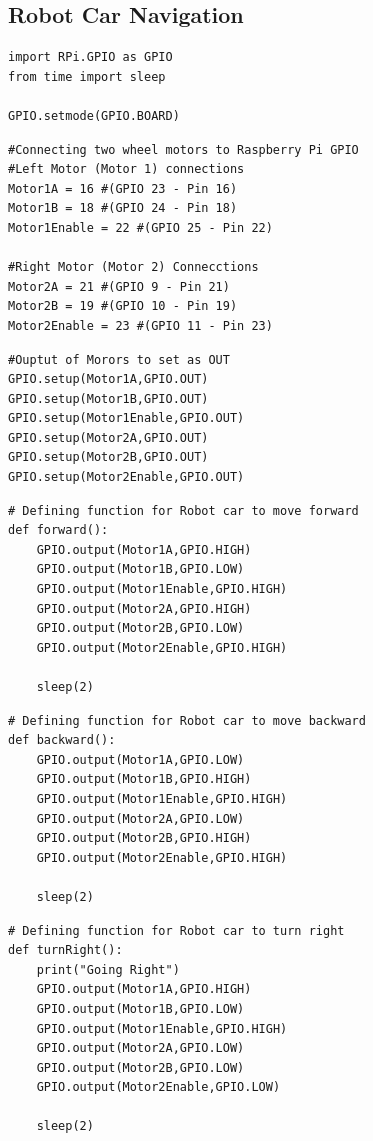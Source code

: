 \subsection{Robot Car Navigation}
\begin{verbatim}
import RPi.GPIO as GPIO
from time import sleep

GPIO.setmode(GPIO.BOARD)
\end{verbatim}

\begin{verbatim}
#Connecting two wheel motors to Raspberry Pi GPIO 
#Left Motor (Motor 1) connections
Motor1A = 16 #(GPIO 23 - Pin 16)
Motor1B = 18 #(GPIO 24 - Pin 18)
Motor1Enable = 22 #(GPIO 25 - Pin 22)

#Right Motor (Motor 2) Connecctions
Motor2A = 21 #(GPIO 9 - Pin 21)
Motor2B = 19 #(GPIO 10 - Pin 19)
Motor2Enable = 23 #(GPIO 11 - Pin 23)
\end{verbatim}

\begin{verbatim}
#Ouptut of Morors to set as OUT
GPIO.setup(Motor1A,GPIO.OUT)
GPIO.setup(Motor1B,GPIO.OUT)
GPIO.setup(Motor1Enable,GPIO.OUT)
GPIO.setup(Motor2A,GPIO.OUT)
GPIO.setup(Motor2B,GPIO.OUT)
GPIO.setup(Motor2Enable,GPIO.OUT)

\end{verbatim}

\begin{verbatim}
# Defining function for Robot car to move forward
def forward():
	GPIO.output(Motor1A,GPIO.HIGH)
	GPIO.output(Motor1B,GPIO.LOW)
	GPIO.output(Motor1Enable,GPIO.HIGH) 
	GPIO.output(Motor2A,GPIO.HIGH)
	GPIO.output(Motor2B,GPIO.LOW)
	GPIO.output(Motor2Enable,GPIO.HIGH) 

	sleep(2)
\end{verbatim}

\begin{verbatim}
# Defining function for Robot car to move backward
def backward():
	GPIO.output(Motor1A,GPIO.LOW)
	GPIO.output(Motor1B,GPIO.HIGH)
	GPIO.output(Motor1Enable,GPIO.HIGH)
	GPIO.output(Motor2A,GPIO.LOW)
	GPIO.output(Motor2B,GPIO.HIGH)
	GPIO.output(Motor2Enable,GPIO.HIGH)

	sleep(2)
\end{verbatim}

\begin{verbatim}
# Defining function for Robot car to turn right
def turnRight():
	print("Going Right")
	GPIO.output(Motor1A,GPIO.HIGH)
	GPIO.output(Motor1B,GPIO.LOW)
	GPIO.output(Motor1Enable,GPIO.HIGH)
	GPIO.output(Motor2A,GPIO.LOW)
	GPIO.output(Motor2B,GPIO.LOW)
	GPIO.output(Motor2Enable,GPIO.LOW)

	sleep(2)
\end{verbatim}

